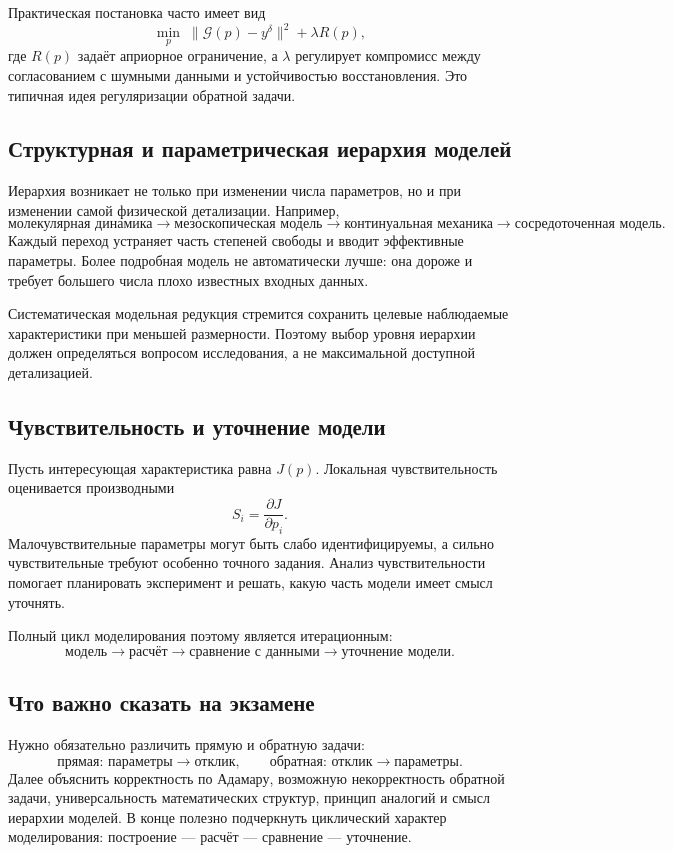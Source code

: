 Практическая постановка часто имеет вид
\[
\min_p \;\|\mathcal G(p)-y^\delta\|^2
+\lambda R(p),
\]
где $R(p)$ задаёт априорное ограничение, а $\lambda$ регулирует компромисс между
согласованием с шумными данными и устойчивостью восстановления. Это типичная
идея регуляризации обратной задачи.

\subsection{Структурная и параметрическая иерархия моделей}

Иерархия возникает не только при изменении числа параметров, но и при изменении
самой физической детализации. Например,
\[
\text{молекулярная динамика}
\rightarrow\text{мезоскопическая модель}
\rightarrow\text{континуальная механика}
\rightarrow\text{сосредоточенная модель}.
\]
Каждый переход устраняет часть степеней свободы и вводит эффективные параметры.
Более подробная модель не автоматически лучше: она дороже и требует большего
числа плохо известных входных данных.

Систематическая модельная редукция стремится сохранить целевые наблюдаемые
характеристики при меньшей размерности. Поэтому выбор уровня иерархии должен
определяться вопросом исследования, а не максимальной доступной детализацией.

\subsection{Чувствительность и уточнение модели}

Пусть интересующая характеристика равна $J(p)$. Локальная чувствительность
оценивается производными
\[
S_i=\frac{\partial J}{\partial p_i}.
\]
Малочувствительные параметры могут быть слабо идентифицируемы, а сильно
чувствительные требуют особенно точного задания. Анализ чувствительности
помогает планировать эксперимент и решать, какую часть модели имеет смысл
уточнять.

Полный цикл моделирования поэтому является итерационным:
\[
\text{модель}\rightarrow\text{расчёт}\rightarrow
\text{сравнение с данными}\rightarrow\text{уточнение модели}.
\]


\subsection{Что важно сказать на экзамене}

Нужно обязательно различить прямую и обратную задачи:
\[
\boxed{\text{прямая: параметры}\to\text{отклик},
\qquad
\text{обратная: отклик}\to\text{параметры}}.
\]
Далее объяснить корректность по Адамару, возможную некорректность обратной задачи, универсальность математических структур, принцип аналогий и смысл иерархии моделей. В конце полезно подчеркнуть циклический характер моделирования: построение --- расчёт --- сравнение --- уточнение.

\newpage
